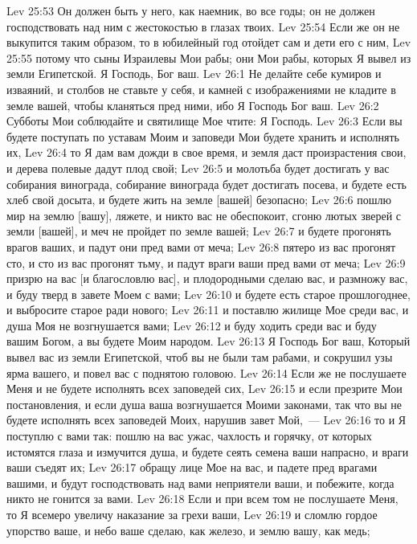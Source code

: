 \vs Lev 25:53 Он должен быть у него, как наемник, во все годы; он не должен господствовать над ним с жестокостью в глазах твоих.
\vs Lev 25:54 Если же он не выкупится таким образом, то в юбилейный год отойдет сам и дети его с ним,
\vs Lev 25:55 потому что сыны Израилевы Мои рабы; они Мои рабы, которых Я вывел из земли Египетской. Я Господь, Бог ваш.
\vs Lev 26:1 Не делайте себе кумиров и изваяний, и столбов не ставьте у себя, и камней с изображениями не кладите в земле вашей, чтобы кланяться пред ними, ибо Я Господь Бог ваш.
\vs Lev 26:2 Субботы Мои соблюдайте и святилище Мое чтите: Я Господь.
\vs Lev 26:3 Если вы будете поступать по уставам Моим и заповеди Мои будете хранить и исполнять их,
\vs Lev 26:4 то Я дам вам дожди в свое время, и земля даст произрастения свои, и дерева полевые дадут плод свой;
\vs Lev 26:5 и молотьба  будет достигать у вас собирания винограда, собирание винограда будет достигать посева, и будете есть хлеб свой досыта, и будете жить на земле [вашей] безопасно;
\vs Lev 26:6 пошлю мир на землю [вашу], ляжете, и никто вас не обеспокоит, сгоню лютых зверей с земли [вашей], и меч не пройдет по земле вашей;
\vs Lev 26:7 и будете прогонять врагов ваших, и падут они пред вами от меча;
\vs Lev 26:8 пятеро из вас прогонят сто, и сто из вас прогонят тьму, и падут враги ваши пред вами от меча;
\vs Lev 26:9 призрю на вас [и благословлю вас], и плодородными сделаю вас, и размножу вас, и буду тверд в завете Моем с вами;
\vs Lev 26:10 и будете есть старое прошлогоднее, и выбросите старое ради нового;
\vs Lev 26:11 и поставлю жилище Мое среди вас, и душа Моя не возгнушается вами;
\vs Lev 26:12 и буду ходить среди вас и буду вашим Богом, а вы будете Моим народом.
\vs Lev 26:13 Я Господь Бог ваш, Который вывел вас из земли Египетской, чтоб вы не были там рабами, и сокрушил узы ярма вашего, и повел вас с поднятою головою.
\vs Lev 26:14 Если же не послушаете Меня и не будете исполнять всех заповедей сих,
\vs Lev 26:15 и если презрите Мои постановления, и если душа ваша возгнушается Моими законами, так что вы не будете исполнять всех заповедей Моих, нарушив завет Мой,~---
\vs Lev 26:16 то и Я поступлю с вами так: пошлю на вас ужас, чахлость и горячку, от которых истомятся глаза и измучится душа, и будете сеять семена ваши напрасно, и враги ваши съедят их;
\vs Lev 26:17 обращу лице Мое на вас, и падете пред врагами вашими, и будут господствовать над вами неприятели ваши, и побежите, когда никто не гонится за вами.
\vs Lev 26:18 Если и при всем том не послушаете Меня, то Я всемеро увеличу наказание за грехи ваши,
\vs Lev 26:19 и сломлю гордое упорство ваше, и небо ваше сделаю, как железо, и землю вашу, как медь;
